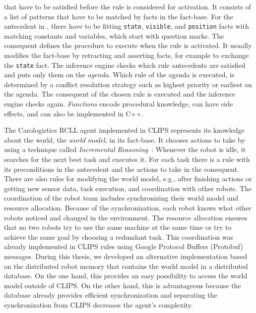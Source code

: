that have to be satisfied before the rule is considered for activation.
It consists of a list of patterns that have to be matched by facts in
the fact-base. For the antecedent in , there
have to be fitting \texttt{state}, \texttt{visible}, and
\texttt{position} facts with matching constants and variables, which
start with question marks. The consequent defines the procedure to execute when the rule is
activated. It usually modifies the fact-base by retracting and
asserting facts, for example to exchange the \texttt{state} fact. The
inference engine checks which rule antecedents are satisfied and puts
only them on the \emph{agenda}. Which rule of the agenda is executed,
is determined by a conflict resolution strategy such as highest
priority or earliest on the agenda. The consequent of the chosen rule
is executed and the inference engine checks again. \emph{Functions}
encode procedural knowledge, can have side effects, and can also be
implemented in C++.

The Carologistics RCLL agent implemented in CLIPS represents its
knowledge about the world, the \emph{world model}, in its
fact-base. It chooses actions to take by using a technique called
\emph{Incremental Reasoning}~\cite{CLIPS-Agent}: Whenever the robot is
idle, it searches for the next best task and executes it.  For each
task there is a rule with its preconditions in the antecedent and the
actions to take in the consequent. There are also rules for modifying
the world model, e.g., after finishing actions or getting new sensor
data, task execution, and coordination with other robots.  The
coordination of the robot team includes synchronizing their world
model and resource allocation. Because of the synchronization, each
robot knows what other robots noticed and changed in the
environment. The resource allocation ensures that no two robots try to
use the same machine at the same time or try to achieve the same goal by
choosing a redundant task. This coordination was already implemented
in CLIPS rules using Google Protocol Buffers (Protobuf)
messages. During this thesis, we developed an alternative
implementation based on the distributed robot memory that contains the
world model in a distributed database. On the one hand, this provides
an easy possibility to access the world model outside of CLIPS. On the
other hand, this is advantageous
because the database already provides efficient synchronization and
separating the synchronization from CLIPS decreases the
agent's complexity.

